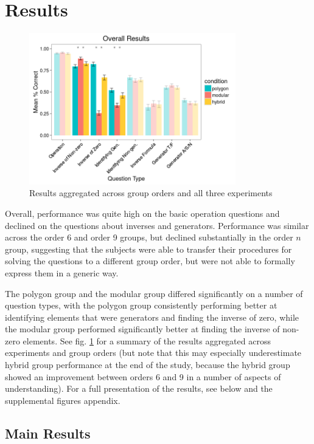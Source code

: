 \documentclass[man,10pt]{apa6}
\begin{document}
\section{Results} %
\begin{figure}
\centering
\includegraphics[width=0.8\textwidth]{figures/overall_results.png}
\caption{Results aggregated across group orders and all three experiments}
\label{overall_results}
\end{figure}
Overall, performance was quite high on the basic operation questions and declined on the questions about inverses and generators. Performance was similar across the order 6 and order 9 groups, but declined substantially in the order $n$ group, suggesting that the subjects were able to transfer their procedures for solving the questions to a different group order, but were not able to formally express them in a generic way. \par
The polygon group and the modular group differed significantly on a number of question types, with the polygon group consistently performing better at identifying elements that were generators and finding the inverse of zero, while the modular group performed significantly better at finding the inverse of non-zero elements. See fig. \ref{overall_results} for a summary of the results aggregated across experiments and group orders (but note that this may especially underestimate hybrid group performance at the end of the study, because the hybrid group showed an improvement between orders 6 and 9 in a number of aspects of understanding). For a full presentation of the results, see below and the supplemental figures appendix.  
\FloatBarrier
\subsection{Main Results}
\end{document}

